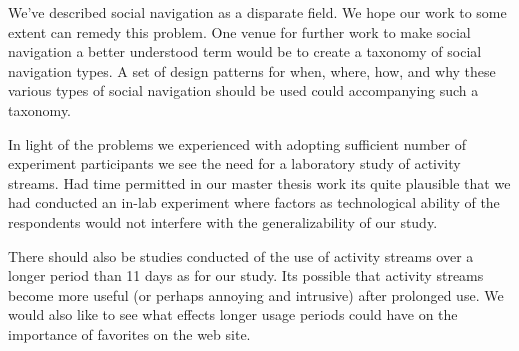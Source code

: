 We've described social navigation as a disparate field. We hope our work to
some extent can remedy this problem. One venue for further work to make social
navigation a better understood term would be to create a taxonomy of social
navigation types. A set of design patterns for when, where, how, and why these
various types of social navigation should be used could accompanying such a
taxonomy.

In light of the problems we experienced with adopting sufficient number of
experiment participants we see the need for a laboratory study of activity
streams. Had time permitted in our master thesis work its quite plausible that
we had conducted an in-lab experiment where factors as technological ability
of the respondents would not interfere with the generalizability of our study.

There should also be studies conducted of the use of activity streams over a
longer period than 11 days as for our study. Its possible that activity
streams become more useful (or perhaps annoying and intrusive) after prolonged
use. We would also like to see what effects longer usage periods could have
on the importance of favorites on the \urort{} web site.
